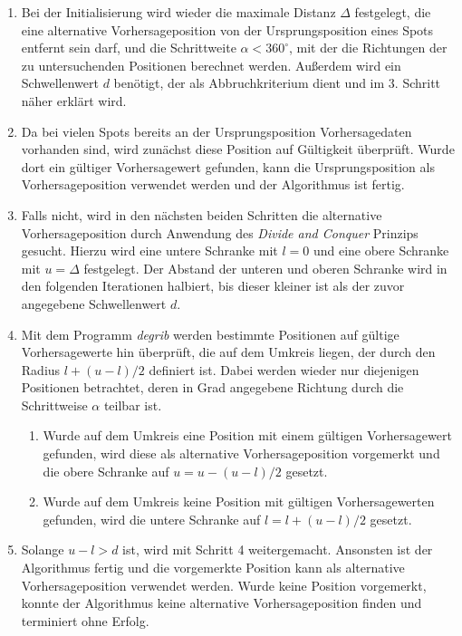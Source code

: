 \begin{enumerate}

\item Bei der Initialisierung wird wieder die maximale Distanz
  $\Delta$ festgelegt, die eine alternative Vorhersageposition von der
  Ursprungsposition eines Spots entfernt sein darf, und die
  Schrittweite $\alpha < 360^{\circ}$, mit der die Richtungen der zu
  untersuchenden Positionen berechnet werden. Außerdem wird ein
  Schwellenwert $d$ benötigt, der als Abbruchkriterium dient und im
  3. Schritt näher erklärt wird.

\item Da bei vielen Spots bereits an der Ursprungsposition
  Vorhersagedaten vorhanden sind, wird zunächst diese Position auf
  Gültigkeit überprüft. Wurde dort ein gültiger Vorhersagewert
  gefunden, kann die Ursprungsposition als Vorhersageposition
  verwendet werden und der Algorithmus ist fertig.

\item Falls nicht, wird in den nächsten beiden Schritten die
  alternative Vorhersageposition durch Anwendung des \textit{Divide
    and Conquer} Prinzips gesucht. Hierzu wird eine untere Schranke
  mit $l = 0$ und eine obere Schranke mit $u = \Delta$ festgelegt. Der
  Abstand der unteren und oberen Schranke wird in den folgenden
  Iterationen halbiert, bis dieser kleiner ist als der zuvor
  angegebene Schwellenwert $d$.

\item Mit dem Programm \textit{degrib} werden bestimmte Positionen auf
  gültige Vorhersagewerte hin überprüft, die auf dem Umkreis liegen,
  der durch den Radius $l + (u - l)/2$ definiert ist. Dabei werden
  wieder nur diejenigen Positionen betrachtet, deren in Grad
  angegebene Richtung durch die Schrittweise $\alpha$ teilbar ist.

  \begin{enumerate}

  \item Wurde auf dem Umkreis eine Position mit einem gültigen
    Vorhersagewert gefunden, wird diese als alternative
    Vorhersageposition vorgemerkt und die obere Schranke auf $u = u -
    (u - l)/2$ gesetzt.

  \item Wurde auf dem Umkreis keine Position mit gültigen
    Vorhersagewerten gefunden, wird die untere Schranke auf $l = l + (u -
    l)/2$ gesetzt.

  \end{enumerate}

\item Solange $u - l > d$ ist, wird mit Schritt 4
  weitergemacht. Ansonsten ist der Algorithmus fertig und die
  vorgemerkte Position kann als alternative Vorhersageposition
  verwendet werden. Wurde keine Position vorgemerkt, konnte der
  Algorithmus keine alternative Vorhersageposition finden und
  terminiert ohne Erfolg.

\end{enumerate}


